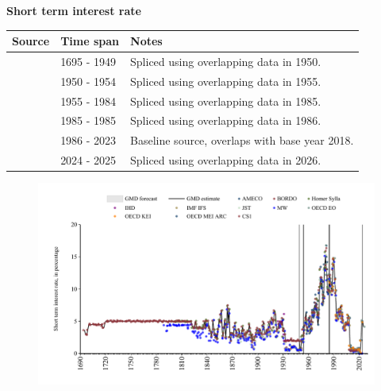 \documentclass[12pt,a4paper,landscape]{article}
\begin{document}
\begin{adjustbox}{max totalsize={\paperwidth}{\paperheight},center}
\begin{minipage}[t][\textheight][t]{\textwidth}
\vspace*{0.5cm}
{}
\begin{center}
{\Large\bfseries Short term interest rate}
\end{center}
\vspace{0.5cm}
\begin{table}[H]
\centering
\small
\begin{tabular}{|l|l|l|}
\hline
\textbf{Source} & \textbf{Time span} & \textbf{Notes} \\
\hline
\rowcolor{white}\cite{CS1_GBR}& 1695 - 1949 &Spliced using overlapping data in 1950. \\
\rowcolor{lightgray}\cite{IMF_IFS}& 1950 - 1954 &Spliced using overlapping data in 1955. \\
\rowcolor{white}\cite{OECD_MEI_ARC}& 1955 - 1984 &Spliced using overlapping data in 1985. \\
\rowcolor{lightgray}\cite{OECD_EO}& 1985 - 1985 &Spliced using overlapping data in 1986. \\
\rowcolor{white}\cite{OECD_KEI}& 1986 - 2023 &Baseline source, overlaps with base year 2018. \\
\rowcolor{lightgray}\cite{OECD_EO}& 2024 - 2025 &Spliced using overlapping data in 2026. \\
\hline
\end{tabular}
\end{table}
\begin{figure}[H]
\centering
\includegraphics[width=\textwidth,height=0.6\textheight,keepaspectratio]{graphs/GBR_strate.pdf}
\end{figure}
\end{minipage}
\end{adjustbox}
\end{document}
